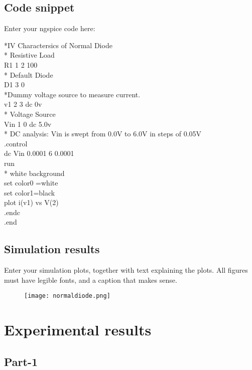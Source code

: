 \documentclass[12pt]{article}
\begin{document}
\subsection{Code snippet}

Enter your ngspice code here:

*IV Charactersics of Normal Diode\\
* Resistive Load\\
R1 1 2 100\\
* Default Diode\\
D1 3 0 \\
*Dummy voltage source to measure current.\\
v1 2 3 dc 0v\\
* Voltage Source\\
Vin 1 0 dc 5.0v\\
* DC analysis: Vin is swept from 0.0V to 6.0V in steps of 0.05V\\
.control \\
dc Vin 0.0001 6 0.0001\\
run\\
* white background\\
set color0 =white\\
set color1=black\\
plot i(v1) vs V(2) \\
.endc\\
.end\\



\subsection{Simulation results}

Enter your simulation plots, together with text explaining the plots. All figures must have legible fonts, and a caption that makes sense.


\begin{figure}[h!]

\centering
\texttt{[image: normaldiode.png]}
\end{figure}
  \newpage


\section{Experimental results}

\subsection{Part-1}
\end{document}
